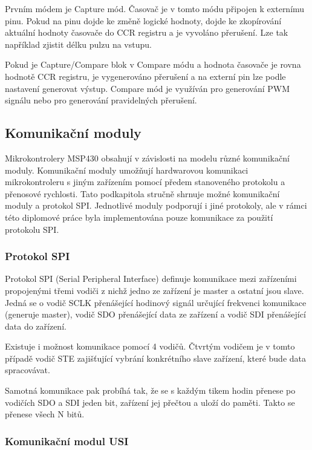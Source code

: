 Prvním módem je Capture mód. Časovač je v tomto módu připojen k externímu pinu. Pokud na pinu dojde ke změně logické hodnoty, dojde ke zkopírování aktuální hodnoty časovače do CCR registru a je vyvoláno přerušení. Lze tak například zjistit délku pulzu na vstupu.

Pokud je Capture/Compare blok v Compare módu a hodnota časovače je rovna hodnotě CCR registru, je vygenerováno přerušení a na externí pin lze podle nastavení generovat výstup. Compare mód je využíván pro generování PWM signálu nebo pro generování pravidelných přerušení.

\subsection{Komunikační moduly}

Mikrokontrolery MSP430 obsahují v závislosti na modelu různé komunikační moduly. Komunikační moduly umožňují hardwarovou komunikaci mikrokontroleru s jiným zařízením pomocí předem stanoveného protokolu a přenosové rychlosti. Tato podkapitola stručně shrnuje možné komunikační moduly a protokol SPI. Jednotlivé moduly podporují i jiné protokoly, ale v rámci této diplomové práce byla implementována pouze komunikace za použití protokolu SPI.

\subsubsection{Protokol SPI}

Protokol SPI (Serial Peripheral Interface) definuje komunikace mezi zařízeními propojenými třemi vodiči z nichž jedno ze zařízení je master a ostatní jsou slave. Jedná se o vodič SCLK přenášející hodinový signál určující frekvenci komunikace (generuje master), vodič SDO přenášející data ze zařízení a vodič SDI přenášející data do zařízení.

Existuje i možnost komunikace pomocí 4 vodičů. Čtvrtým vodičem je v tomto případě vodič STE zajišťující vybrání konkrétního slave zařízení, které bude data spracovávat.

Samotná komunikace pak probíhá tak, že se s každým tikem hodin přenese po vodičích SDO a SDI jeden bit, zařízení jej přečtou a uloží do paměti. Takto se přenese všech N bitů.

\subsubsection{Komunikační modul USI}

